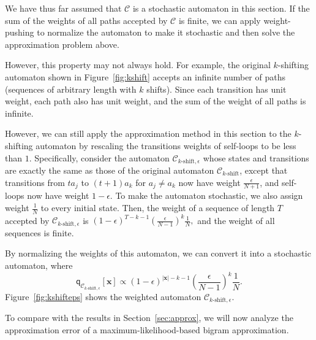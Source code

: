 \documentclass{article}
\newcommand{\sC}{\mathscr C}
\newcommand{\bx}{{\mathbf x}}
\newcommand{\sfq}{{\mathsf q}}
\newcommand{\e}{\epsilon}
\begin{document}
We have thus far assumed that $\sC$ is a stochastic automaton in this 
section. If 
the sum of the weights of all paths accepted by $\sC$ is finite, we can
apply weight-pushing to normalize the automaton to make it stochastic 
and then solve the approximation problem above. 

However, this property may not always hold. For example, the original $k$-shifting
automaton shown in Figure~\ref{fig:kshift} accepts an infinite number of paths (sequences of
arbitrary length with $k$ shifts). Since each transition has unit weight, 
each path also has unit weight, and the sum of the weight of all paths is infinite.

However, we can still apply the approximation method in this section to the $k$-shifting
automaton by rescaling the transitions weights of self-loops to be less than $1$.
Specifically, consider the automaton $\sC_{\text{$k$-shift}, \e}$
whose states and transitions are exactly the same as those of the original
automaton $\sC_{\text{$k$-shift}}$, except that transitions
from $ta_j$ to $(t+1)a_{k}$ for $a_j \neq a_{k}$ now have weight 
$\frac{\e}{N+1}$, and self-loops now have weight $1-\e$. To make the automaton
stochastic, we also assign weight $\frac{1}{N}$ to every initial state.
Then, the weight of a sequence of length $T$ accepted by $\sC_{\text{$k$-shift},\e}$
is $(1-\e)^{T-k-1} \left(\frac{\e}{N-1}\right)^k \frac{1}{N},$
and the weight of all sequences is finite.

By normalizing the weights of this automaton, we can convert it into a 
stochastic automaton, where 
$$\sfq_{\sC_{\text{$k$-shift},\e}}[\bx] \propto   (1-\e)^{|\bx|-k-1} \left(\frac{\e}{N-1}\right)^k \frac{1}{N}.$$
Figure~\ref{fig:kshifteps} shows the weighted automaton $\sC_{\text{$k$-shift},\e}$.

To compare with the results in Section~\ref{sec:approx}, we will now 
analyze the approximation error of a maximum-likelihood-based 
bigram approximation. 
\end{document}
